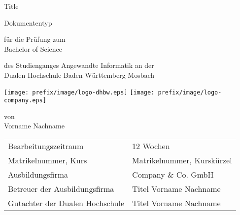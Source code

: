 \def\doctype{Dokumententyp}
\def\title{Title}
\def\author{Vorname Nachname}

\begin{titlepage}

\vspace{10mm}

\begin{center}
	\vspace{5mm}
	
	\huge \title
	
	\vspace{14.2pt}
	
	\large \doctype
	
	
	\vspace{42.6pt}
	
	\small für die Prüfung zum \\
	\large Bachelor of Science
	
	\vspace{42.6pt}
	
	\small des Studienganges Angewandte Informatik an der \\
	\large Dualen Hochschule Baden-Württemberg Mosbach
    
    \vspace{14.2pt}
    
    \texttt{[image: prefix/image/logo-dhbw.eps]}
    \hspace{35pt}
	\texttt{[image: prefix/image/logo-company.eps]}
	
	\vspace{42.6pt}
	
	\small von \\
	\large \author
\end{center}

\vspace{98.6pt}

\begin{table}[h]
    \centering
    \begin{tabular}{ll}
        \small Bearbeitungszeitraum                 & 12 Wochen                     \\
        \small Matrikelnummer, Kurs                 & Matrikelnummer, Kurskürzel    \\
        \small Ausbildungsfirma                     & Company \& Co. GmbH           \\
        \small Betreuer der Ausbildungsfirma        & Titel Vorname Nachname        \\
        \small Gutachter der Dualen Hochschule      & Titel Vorname Nachname        \\
    \end{tabular}
\end{table}

\vspace{49.7pt}


\end{titlepage}
